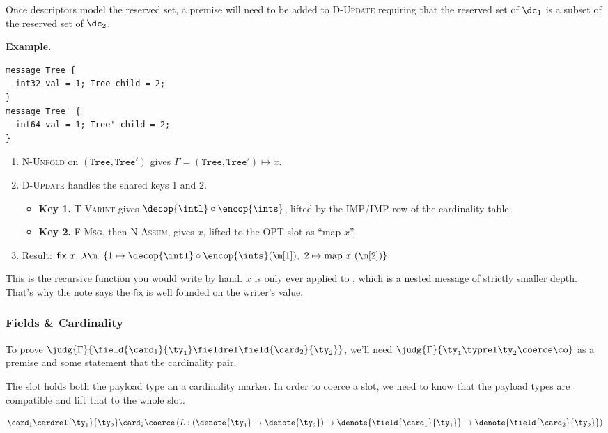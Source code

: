 Once descriptors model the reserved set, a premise will need to be added to
\textsc{D-Update} requiring that the reserved set of $\dc_1$ is a subset of the
reserved set of $\dc_2$. %

\textbf{Example.}

\begin{verbatim}
message Tree {
  int32 val = 1; Tree child = 2;
}
message Tree' {
  int64 val = 1; Tree' child = 2;
}
\end{verbatim}

\begin{enumerate}
\item \textsc{N-Unfold} on $(\mathtt{Tree}, \mathtt{Tree'})$ gives $\Gamma =
  (\mathtt{Tree}, \mathtt{Tree'}) \mapsto x$.
\item \textsc{D-Update} handles the shared keys 1 and 2.
  \begin{itemize}
  \item \textbf{Key 1.} \textsc{T-Varint} gives
    $\decop{\intl} \circ \encop{\ints}$, lifted by the IMP/IMP row
    of the cardinality table.
  \item \textbf{Key 2.} \textsc{F-Msg}, then \textsc{N-Assum}, gives $x$, lifted to the OPT slot as ``map $x$''.
  \end{itemize}
\item Result: $\mathsf{fix}\ x.\ \lambda \m.\ \{1 \mapsto \decop{\intl}\circ\encop{\ints}(\m[1]),\ 2 \mapsto \mathrm{map}\ x\ (\m[2])\}$
\end{enumerate}

This is the recursive function you would write by hand. $x$ is only ever applied
to \m[2], which is a nested message of strictly smaller depth. That's why the
note says the $\mathsf{fix}$ is well founded on the writer's value.

\subsubsection{Fields \& Cardinality}

To prove
$\judg{\Gamma}{\field{\card_1}{\ty_1} \fieldrel \field{\card_2}{\ty_2}}$, we'll need
$\judg{\Gamma}{\ty_1 \typrel \ty_2 \coerce \co}$ as a premise and some statement that the
cardinality pair.

The slot holds both the payload type an a cardinality marker. In order to
coerce a slot, we need to know that the payload types are compatible and lift
that to the whole slot.

\[ \card_1 \cardrel{\ty_1}{\ty_2} \card_2 \coerce \left( L : \left(\denote{\ty_1} \to \denote{\ty_2}\right) \rightarrow
    \denote{\field{\card_1}{\ty_1}} \rightarrow \denote{\field{\card_2}{\ty_2}} \right) \]

